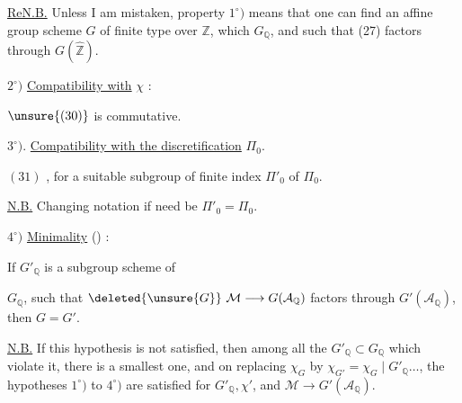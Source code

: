 
\uline{ReN.B.} Unless I am mistaken, property \(1^\circ)\) means that one can find an affine group scheme \(G\) of finite type over \(\mathbb{Z}\), which  \(G_{\mathbb{Q}}\), and such that (27) factors through \(G(\widehat{\mathbb{Z}})\).

\(2^\circ)\) \uline{Compatibility with} \(\chi\) :

\(\unsure{(30)}\)
is commutative.

\(3^\circ)\). \uline{Compatibility with the discretification} \(\Pi_0\).

\((31)\)
,
for a suitable subgroup of finite index \(\Pi'_0\) of \(\Pi_0\).

\uline{N.B.} Changing notation if need be  \(\Pi'_0=\Pi_0\).

\(4^\circ)\) \uline{Minimality} () :

If \(G'_{\mathbb{Q}}\) is a subgroup scheme of


\(G_{\mathbb{Q}}\), such that \(\deleted{\unsure{G}}\ \mathcal{M}\longrightarrow G(\mathcal{A}_{\mathbb{Q}})\) factors through \(G'(\mathcal{A}_{\mathbb{Q}})\), then \(G=G'\).

\uline{N.B.} If this hypothesis is not satisfied, then among all the \(G'_{\mathbb{Q}}\subset G_{\mathbb{Q}}\) which violate it, there is a  smallest one, and on replacing \(\chi_G\) by \(\chi_{G'}=\chi_G\mid G'_{\mathbb{Q}}\ldots\), the hypotheses \(1^\circ)\) to \(4^\circ)\) are satisfied for \(G'_{\mathbb{Q}},\chi'\), and \(\mathcal{M}\longrightarrow G'(\mathcal{A}_{\mathbb{Q}})\).

